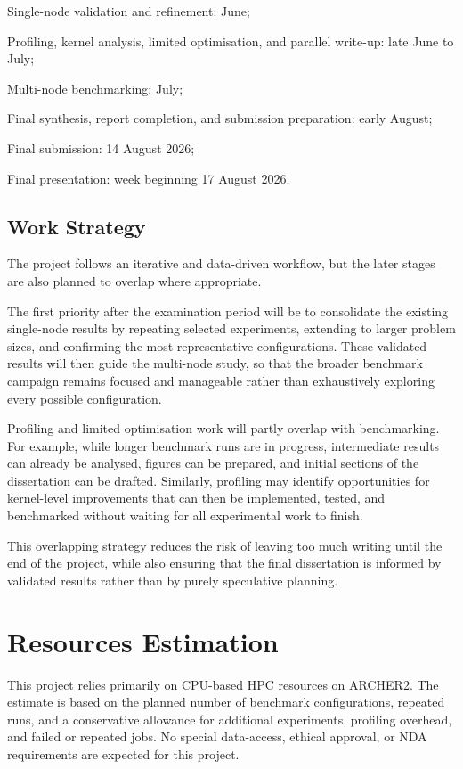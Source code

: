 \documentclass{article}
\begin{document}
Single-node validation and refinement: June;

Profiling, kernel analysis, limited optimisation, and parallel write-up: late June to July;

Multi-node benchmarking: July;

Final synthesis, report completion, and submission preparation: early August;

Final submission: 14 August 2026;

Final presentation: week beginning 17 August 2026.


\subsection{Work Strategy}

The project follows an iterative and data-driven workflow, but the later stages are also planned to overlap where appropriate.

The first priority after the examination period will be to consolidate the existing single-node results by repeating selected experiments, extending to larger problem sizes, and confirming the most representative configurations. 
These validated results will then guide the multi-node study, so that the broader benchmark campaign remains focused and manageable rather than exhaustively exploring every possible configuration.

Profiling and limited optimisation work will partly overlap with benchmarking. 
For example, while longer benchmark runs are in progress, intermediate results can already be analysed, figures can be prepared, and initial sections of the dissertation can be drafted. 
Similarly, profiling may identify opportunities for kernel-level improvements that can then be implemented, tested, and benchmarked without waiting for all experimental work to finish.

This overlapping strategy reduces the risk of leaving too much writing until the end of the project, while also ensuring that the final dissertation is informed by validated results rather than by purely speculative planning.



\section{Resources Estimation}

This project relies primarily on CPU-based HPC resources on ARCHER2. 
The estimate is based on the planned number of benchmark configurations, repeated runs, and a conservative allowance for additional experiments, profiling overhead, and failed or repeated jobs.
No special data-access, ethical approval, or NDA requirements are expected for this project.
\end{document}
